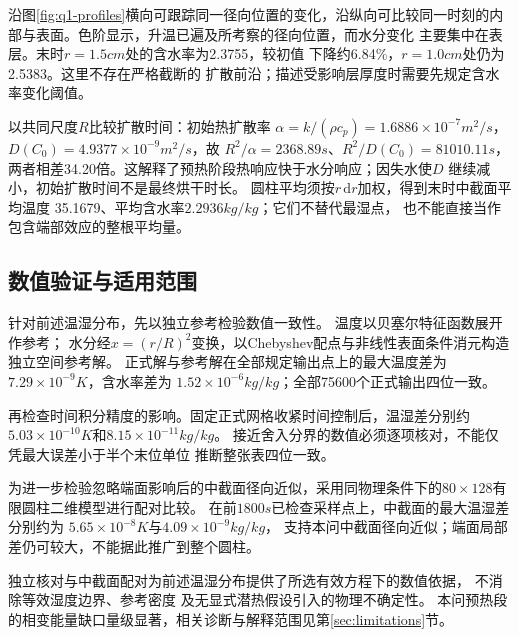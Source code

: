 沿图\ref{fig:q1-profiles}横向可跟踪同一径向位置的变化，沿纵向可比较同一时刻的内部与表面。色阶显示，升温已遍及所考察的径向位置，而水分变化
主要集中在表层。末时$r=1.5\unit{cm}$处的含水率为2.3755，较初值
下降约6.84\%，$r=1.0\unit{cm}$处仍为2.5383。这里不存在严格截断的
扩散前沿；描述受影响层厚度时需要先规定含水率变化阈值。

以共同尺度$R$比较扩散时间：初始热扩散率
$\alpha=k/(\rho c_p)=1.6886\times10^{-7}\unit{m^2/s}$，
$D(C_0)=4.9377\times10^{-9}\unit{m^2/s}$，故
$R^2/\alpha=2368.89\unit{s}$、$R^2/D(C_0)=81010.11\unit{s}$，
两者相差34.20倍。这解释了预热阶段热响应快于水分响应；因失水使$D$
继续减小，初始扩散时间不是最终烘干时长。
圆柱平均须按$r\,\mathrm dr$加权，得到末时中截面平均温度
35.1679\celsius、平均含水率$2.2936\unit{kg/kg}$；它们不替代最湿点，
也不能直接当作包含端部效应的整根平均量。

\subsection{数值验证与适用范围}
针对前述温湿分布，先以独立参考检验数值一致性。
温度以贝塞尔特征函数展开作参考；
水分经$x=(r/R)^2$变换，以Chebyshev配点与非线性表面条件消元构造独立空间参考解。
正式解与参考解在全部规定输出点上的最大温度差为
$7.29\times10^{-9}\unit{K}$，含水率差为
$1.52\times10^{-6}\unit{kg/kg}$；全部75600个正式输出四位一致。

再检查时间积分精度的影响。固定正式网格收紧时间控制后，温湿差分别约
$5.03\times10^{-10}\unit{K}$和$8.15\times10^{-11}\unit{kg/kg}$。
接近舍入分界的数值必须逐项核对，不能仅凭最大误差小于半个末位单位
推断整张表四位一致。

为进一步检验忽略端面影响后的中截面径向近似，采用同物理条件下的$80\times128$有限圆柱二维模型进行配对比较。
在前$1800\unit{s}$已检查采样点上，中截面的最大温湿差分别约为
$5.65\times10^{-8}\unit{K}$与$4.09\times10^{-9}\unit{kg/kg}$，
支持本问中截面径向近似；端面局部差仍可较大，不能据此推广到整个圆柱。

独立核对与中截面配对为前述温湿分布提供了所选有效方程下的数值依据，
不消除等效湿度边界、参考密度
及无显式潜热假设引入的物理不确定性。
本问预热段的相变能量缺口量级显著，相关诊断与解释范围见第\ref{sec:limitations}节。
\FloatBarrier
\endgroup
